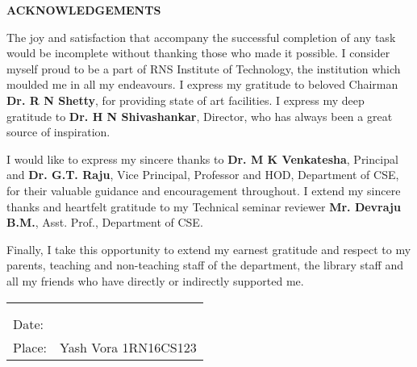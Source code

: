 \thispagestyle{empty}
\begin{center}
\textup{\large{\textbf{ACKNOWLEDGEMENTS}}} \\[0.1in]
\end{center}

\justify
\indent
The joy and satisfaction that accompany the successful completion of any task would be incomplete without thanking those who made it possible. I consider myself proud to be a part of RNS Institute of Technology, the institution which moulded me in all my endeavours. I express my gratitude to beloved Chairman \textbf{Dr. R N Shetty}, for providing state of art facilities. I express my deep gratitude to \textbf{Dr. H N Shivashankar}, Director, who has always been a great source of inspiration.

\medskip

I would like to express my sincere thanks to \textbf{Dr. M K Venkatesha}, Principal and \textbf{Dr. G.T. Raju}, Vice Principal, Professor and HOD, Department of CSE, for their valuable guidance and encouragement throughout. I extend my sincere thanks and heartfelt gratitude to my Technical seminar reviewer \textbf{Mr. Devraju B.M.}, Asst. Prof., Department of CSE.

\medskip

Finally, I take this opportunity to extend my earnest gratitude and respect to my parents, teaching and non-teaching staff of the department, the library staff and all my friends who have directly or indirectly supported me.

\vfill

\justify
\begin{tabularx}{\linewidth}{X X}
 & {\hfill}\textup{ }\\ 
  & {\hfill}\textup{ }\\ 
 \textup{Date:} & {\hfill}\textup{ }\\
\textup{Place:} & {\hfill}\textup{Yash Vora 1RN16CS123}\\
\end{tabularx}


\pagebreak